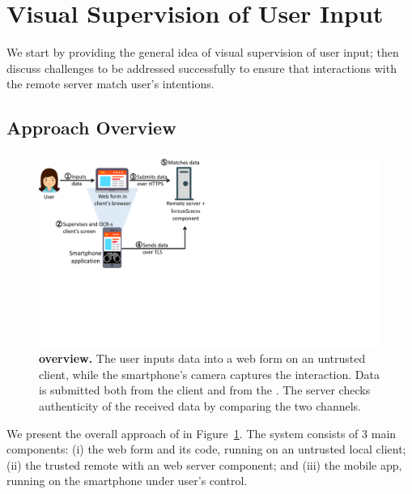\section{Visual Supervision of User Input}
\label{integriscreen:sec:systemDesign}

We start by providing the general idea of visual supervision of user input; then discuss challenges to be addressed successfully to ensure that interactions with the remote server match user's intentions.


\subsection{Approach Overview}
\label{integriscreen:sec:systemDesign:overallApproach}


\begin{figure}[t]
	\centering
	\includegraphics[trim={0 7cm 17cm 0},clip,width=0.75\linewidth]{chapters/IntegriScreen/img/systemModel.pdf}
	\caption[\sysname overview.]{\textbf{\sysname overview.}
	    \one The user inputs data into a web form on an untrusted client, \two while the smartphone's camera captures the interaction.
	    \three Data is submitted both from the client and \four from the \app.
		\five The server checks authenticity of the received data by comparing the two channels.}
	\label{integriscreen:fig:systemModel}
\end{figure}


We present the overall approach of \sysname in Figure~\ref{integriscreen:fig:systemModel}.
The system consists of 3 main components: (i) the web form and its code, running on an untrusted local client; (ii) the trusted remote \server with an \name web server component; and (iii) the mobile app, running on the smartphone under user's control.

